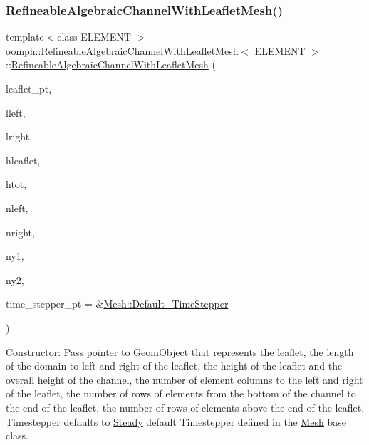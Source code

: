 \subsubsection{\texorpdfstring{Refineable\+Algebraic\+Channel\+With\+Leaflet\+Mesh()}{RefineableAlgebraicChannelWithLeafletMesh()}}
{\footnotesize\ttfamily template$<$class E\+L\+E\+M\+E\+NT $>$ \\
\hyperlink{classoomph_1_1RefineableAlgebraicChannelWithLeafletMesh}{oomph\+::\+Refineable\+Algebraic\+Channel\+With\+Leaflet\+Mesh}$<$ E\+L\+E\+M\+E\+NT $>$\+::\hyperlink{classoomph_1_1RefineableAlgebraicChannelWithLeafletMesh}{Refineable\+Algebraic\+Channel\+With\+Leaflet\+Mesh} (\begin{DoxyParamCaption}\item[{\hyperlink{classoomph_1_1GeomObject}{Geom\+Object} $\ast$}]{leaflet\+\_\+pt,  }\item[{const double \&}]{lleft,  }\item[{const double \&}]{lright,  }\item[{const double \&}]{hleaflet,  }\item[{const double \&}]{htot,  }\item[{const unsigned \&}]{nleft,  }\item[{const unsigned \&}]{nright,  }\item[{const unsigned \&}]{ny1,  }\item[{const unsigned \&}]{ny2,  }\item[{\hyperlink{classoomph_1_1TimeStepper}{Time\+Stepper} $\ast$}]{time\+\_\+stepper\+\_\+pt = {\ttfamily \&\hyperlink{classoomph_1_1Mesh_a12243d0fee2b1fcee729ee5a4777ea10}{Mesh\+::\+Default\+\_\+\+Time\+Stepper}} }\end{DoxyParamCaption})\hspace{0.3cm}{\ttfamily [inline]}}



Constructor\+: Pass pointer to \hyperlink{classoomph_1_1GeomObject}{Geom\+Object} that represents the leaflet, the length of the domain to left and right of the leaflet, the height of the leaflet and the overall height of the channel, the number of element columns to the left and right of the leaflet, the number of rows of elements from the bottom of the channel to the end of the leaflet, the number of rows of elements above the end of the leaflet. Timestepper defaults to \hyperlink{classoomph_1_1Steady}{Steady} default Timestepper defined in the \hyperlink{classoomph_1_1Mesh}{Mesh} base class. 



